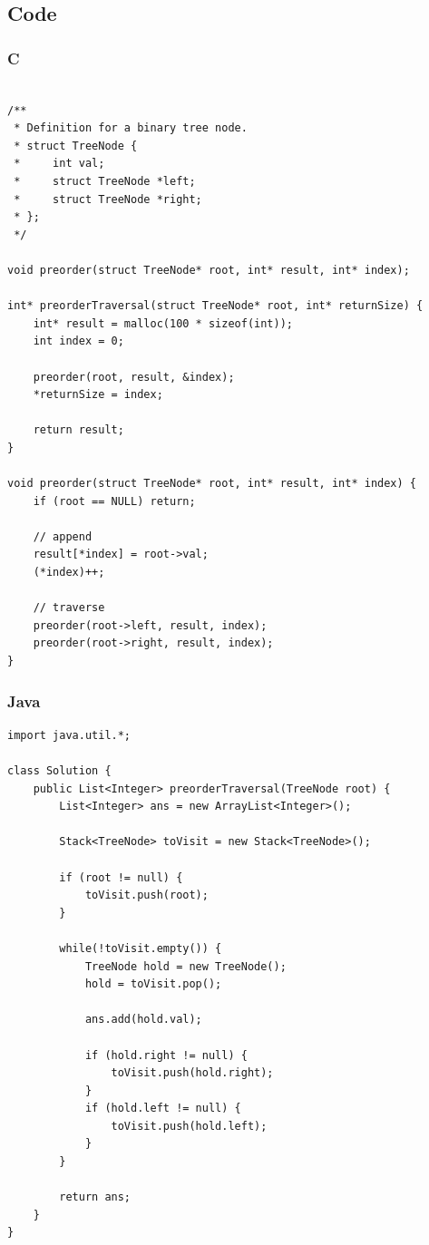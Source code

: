 \documentclass[11pt]{article}
\begin{document}
\subsection{Code}
\subsubsection{C}

\begin{verbatim}

/**
 * Definition for a binary tree node.
 * struct TreeNode {
 *     int val;
 *     struct TreeNode *left;
 *     struct TreeNode *right;
 * };
 */

void preorder(struct TreeNode* root, int* result, int* index);

int* preorderTraversal(struct TreeNode* root, int* returnSize) {
    int* result = malloc(100 * sizeof(int));
    int index = 0;

    preorder(root, result, &index);
    *returnSize = index;

    return result;
}

void preorder(struct TreeNode* root, int* result, int* index) {
    if (root == NULL) return;

    // append
    result[*index] = root->val;
    (*index)++;

    // traverse
    preorder(root->left, result, index);
    preorder(root->right, result, index);
}

\end{verbatim}


\subsubsection{Java}

\begin{verbatim}
import java.util.*;

class Solution {
    public List<Integer> preorderTraversal(TreeNode root) {
        List<Integer> ans = new ArrayList<Integer>();

        Stack<TreeNode> toVisit = new Stack<TreeNode>();

        if (root != null) {
            toVisit.push(root);
        }

        while(!toVisit.empty()) {
            TreeNode hold = new TreeNode();
            hold = toVisit.pop();

            ans.add(hold.val);

            if (hold.right != null) {
                toVisit.push(hold.right);
            }
            if (hold.left != null) {
                toVisit.push(hold.left);
            }
        }

        return ans;
    }
}
\end{verbatim}
\end{document}
